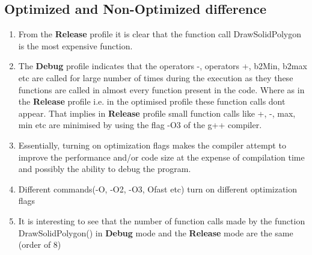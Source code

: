 \documentclass{article}
\begin{document}
\subsection{Optimized and Non-Optimized difference}
\begin{enumerate}
\item From the \textbf{Release} profile it is clear that the function call DrawSolidPolygon is the most expensive function.
\item The \textbf{Debug} profile indicates that the operators -, operators +, b2Min, b2max etc are called for large number of times during the execution as they these functions are called in almost every function present in the code.
Where as in the \textbf{Release} profile i.e. in the optimised profile these function calls dont appear.
That implies in \textbf{Release} profile small function calls like +, -, max, min etc are minimised by using the flag 
-O3 of the g++ compiler.
\item Essentially, turning on optimization flags makes the compiler attempt to improve the performance and/or code size at the expense of compilation time and possibly the ability to debug the program.
\item Different commands(-O, -O2, -O3, Ofast etc) turn on different optimization flags \cite{gnu}
\item It is interesting to see that the number of function calls made by the function DrawSolidPolygon() in \textbf{Debug} mode and the \textbf{Release} mode are the same (order of 8)
\end{enumerate}
\end{document}

